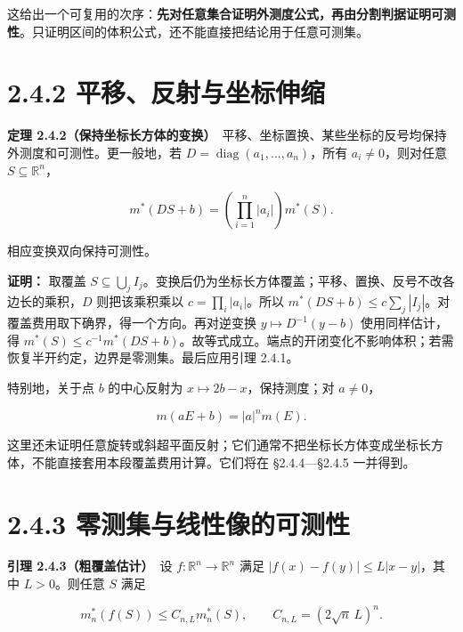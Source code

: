 \documentclass[11pt,a4paper]{article}
\begin{document}
这给出一个可复用的次序：\textbf{先对任意集合证明外测度公式，再由分割判据证明可测性}。只证明区间的体积公式，还不能直接把结论用于任意可测集。

\section[\S{}2.4.2
平移、反射与坐标伸缩]{2.4.2
平移、反射与坐标伸缩}\label{ux5e73ux79fbux53cdux5c04ux4e0eux5750ux6807ux4f38ux7f29}

\textbf{定理
2.4.2（保持坐标长方体的变换）}　平移、坐标置换、某些坐标的反号均保持外测度和可测性。更一般地，若
\(D=\operatorname{diag}(a_1,\ldots,a_n)\)，所有 \(a_i\ne0\)，则对任意
\(S\subseteq\mathbb R^n\)，

\begin{equation*}
m^*(DS+b)=\left(\prod_{i=1}^n|a_i|\right)m^*(S).
\tag{2.4.3}
\end{equation*}

相应变换双向保持可测性。

\textbf{证明：} 取覆盖
\(S\subseteq\bigcup_jI_j\)。变换后仍为坐标长方体覆盖；平移、置换、反号不改各边长的乘积，\(D\)
则把该乘积乘以 \(c=\prod_i|a_i|\)。所以
\(m^*(DS+b)\le c\sum_j|I_j|\)。对覆盖费用取下确界，得一个方向。再对逆变换
\(y\mapsto D^{-1}(y-b)\) 使用同样估计，得
\(m^*(S)\le c^{-1}m^*(DS+b)\)。故等式成立。端点的开闭变化不影响体积；若需恢复半开约定，边界是零测集。最后应用引理
2.4.1。

特别地，关于点 \(b\) 的中心反射为 \(x\mapsto2b-x\)，保持测度；对
\(a\ne0\)，

\begin{equation*}
m(aE+b)=|a|^n m(E).
\tag{2.4.4}
\end{equation*}

这里还未证明任意旋转或斜超平面反射；它们通常不把坐标长方体变成坐标长方体，不能直接套用本段覆盖费用计算。它们将在
§2.4.4---§2.4.5 一并得到。

\section[\S{}2.4.3
零测集与线性像的可测性]{2.4.3
零测集与线性像的可测性}\label{ux96f6ux6d4bux96c6ux4e0eux7ebfux6027ux50cfux7684ux53efux6d4bux6027}

\textbf{引理 2.4.3（粗覆盖估计）}　设 \(f:\mathbb R^n\to\mathbb R^n\)
满足 \(|f(x)-f(y)|\le L|x-y|\)，其中 \(L>0\)。则任意 \(S\) 满足

\begin{equation*}
m_n^*(f(S))\le C_{n,L}m_n^*(S),\qquad C_{n,L}=(2\sqrt n\,L)^n.
\tag{2.4.5}
\end{equation*}
\end{document}
